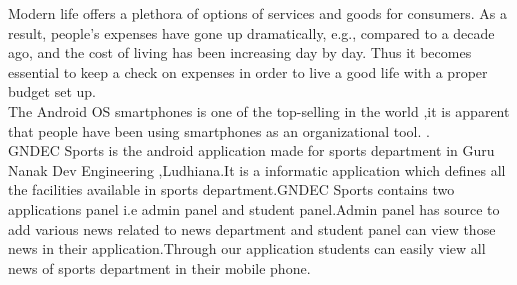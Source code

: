 \begin{Large}
\end{Large}
\vskip 0.1in Modern life offers a plethora of options of services and goods for consumers. As a 
result, people’s expenses have gone up dramatically, e.g., compared to a decade ago, and the 
cost of living has been increasing day by day. Thus it becomes essential to keep a check on expenses in order to live a good life with a proper budget set up.  \\

\noindent The Android OS smartphones is one of the top-selling  in the world ,it is apparent that people have been using smartphones as an organizational tool. .\\

\noindent GNDEC Sports is the android application made for sports department in Guru Nanak Dev
Engineering ,Ludhiana.It is a informatic application which defines all the facilities available
in sports department.GNDEC Sports contains two applications panel i.e admin panel and
student panel.Admin panel has source to add various news related to news department and
student panel can view those news in their application.Through our application students can
easily view all news of sports department in their mobile phone.